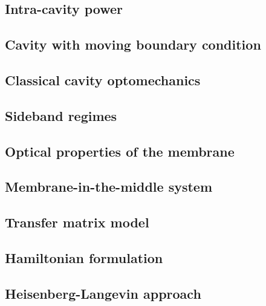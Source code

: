 \documentclass[12pt,twoside]{report}
\begin{document}
\subsection{Intra-cavity power}


\subsection{Cavity with moving boundary condition}


\subsection{Classical cavity optomechanics} \label{sec:clas_opt_mech}


\subsection{Sideband regimes}


\subsection{Optical properties of the membrane}


\subsection{Membrane-in-the-middle system}


\subsection{Transfer matrix model} \label{sec:trans_matrix}


\subsection{Hamiltonian formulation}


\subsection{Heisenberg-Langevin approach}

\end{document}
